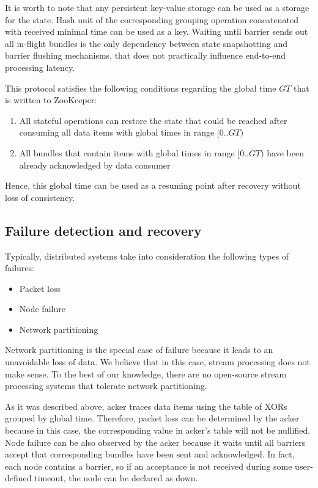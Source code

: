 It is worth to note that any persistent key-value storage can be used as a storage for the state. Hash unit of the corresponding grouping operation concatenated with received minimal time can be used as a key. Waiting until barrier sends out all in-flight bundles is the only dependency between state snapshotting and barrier flushing mechanisms, that does not practically influence end-to-end processing latency. 

This protocol satisfies the following conditions regarding the global time $GT$ that is written to ZooKeeper:
\begin{enumerate}
    \item All stateful operations can restore the state that could be reached after consuming all data items with global times in range $[0..GT)$ 
    \item All bundles that contain items with global times in range $[0..GT)$ have been already acknowledged by data consumer 
\end{enumerate}

Hence, this global time can be used as a resuming point after recovery without loss of consistency.

\subsection{Failure detection and recovery}
Typically, distributed systems take into consideration the following types of failures:
\begin{itemize}
    \item Packet loss
    \item Node failure
    \item Network partitioning
\end{itemize}

Network partitioning is the special case of failure because it leads to an unavoidable loss of data. We believe that in this case, stream processing does not make sense. To the best of our knowledge, there are no open-source stream processing systems that tolerate network partitioning.

As it was described above, acker traces data items using the table of XORs grouped by global time. Therefore, packet loss can be determined by the acker because in this case, the corresponding value in acker's table will not be nullified. Node failure can be also observed by the acker because it waits until all barriers accept that corresponding bundles have been sent and acknowledged. In fact, each node contains a barrier, so if an acceptance is not received during some user-defined timeout, the node can be declared as down. 

